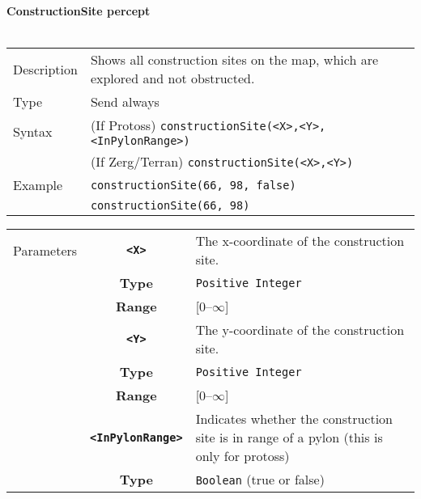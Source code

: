 \newpage
\noindent
\textbf{ConstructionSite percept}\\
\\
\begin{tabularx}{\textwidth}{lX}
 Description & Shows all construction sites on the map, which are explored and not obstructed. \\
 Type & Send always \\
 Syntax & (If Protoss) \verb|constructionSite(<X>,<Y>,<InPylonRange>)| \\
        & (If Zerg/Terran) \verb|constructionSite(<X>,<Y>)| \\
 Example & \verb|constructionSite(66, 98, false)| \\
         & \verb|constructionSite(66, 98)| \\
 \end{tabularx}
 \begin{tabularx}{\textwidth}{l | c | p{8cm}|}
 \cline{2-3} 
 Parameters & \textbf{\verb|<X>|} & The x-coordinate of the construction site.\\
            & \textbf{Type} & \verb|Positive Integer| \\
            & \textbf{Range} & [0--$\infty$] \\
            \cline{2-3} 
            & \textbf{\verb|<Y>|} & The y-coordinate of the construction site.\\
            & \textbf{Type} & \verb|Positive Integer| \\
            & \textbf{Range} & [0--$\infty$] \\
            \cline{2-3} 
            & \textbf{\verb|<InPylonRange>|} & Indicates whether the construction site is in range of a pylon (this is only for protoss)\\
            & \textbf{Type} & \verb|Boolean| (true or false) \\
            \cline{2-3} 
\end{tabularx} \\
